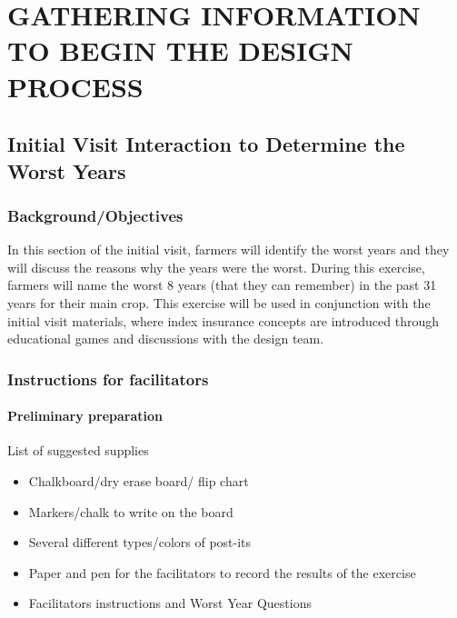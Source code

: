 \documentclass[letterpaper,10pt,english]{sphinxmanual}
\begin{document}
\chapter{GATHERING INFORMATION TO BEGIN THE DESIGN PROCESS}
\label{index_updated_educationalMat:gathering-information-to-begin-the-design-process}

\section{Initial Visit Interaction to Determine the Worst Years}
\label{games/initialvisitexercise_Ethiopia::doc}\label{games/initialvisitexercise_Ethiopia:initial-visit-interaction-to-determine-the-worst-years}

\subsection{Background/Objectives}
\label{games/initialvisitexercise_Ethiopia:background-objectives}
In this section of the initial visit, farmers will identify the worst years and they will discuss the reasons why the years were the worst. During this exercise, farmers will name the worst 8 years (that they can remember) in the past 31 years for their main crop. This exercise will be used in conjunction with the initial visit materials, where index insurance concepts are introduced through educational games and discussions with the design team.


\subsection{Instructions for facilitators}
\label{games/initialvisitexercise_Ethiopia:instructions-for-facilitators}

\subsubsection{Preliminary preparation}
\label{games/initialvisitexercise_Ethiopia:preliminary-preparation}
List of suggested supplies
\begin{itemize}
\item {} 
Chalkboard/dry erase board/ flip chart

\item {} 
Markers/chalk to write on the board

\item {} 
Several different types/colors of post-its

\item {} 
Paper and pen for the facilitators to record the results of the exercise

\item {} 
Facilitators instructions and Worst Year Questions

\end{itemize}
\end{document}
